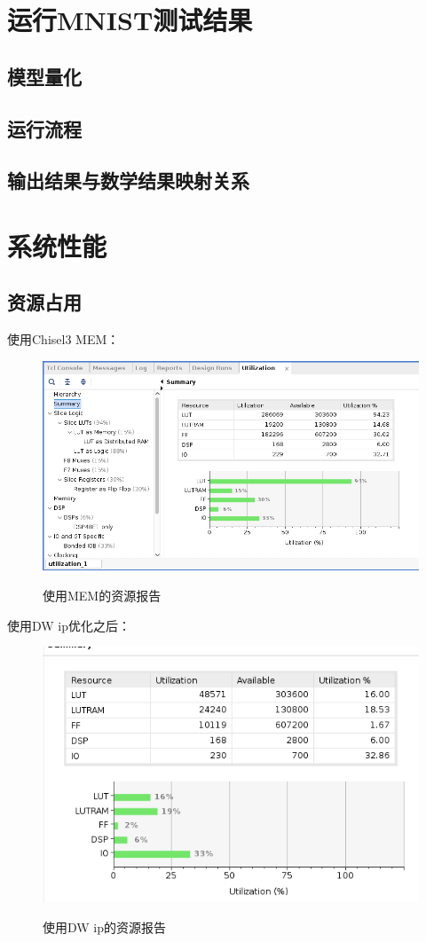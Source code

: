 \section{运行MNIST测试结果}
    \subsection{模型量化}
    \subsection{运行流程}
    \subsection{输出结果与数学结果映射关系}

\section{系统性能}
    \subsection{资源占用}
    使用Chisel3 MEM：
    \begin{figure}[h]
        \centering
        \includegraphics[scale=0.5]{../pdf/old_resource.png}\\
        \caption{使用MEM的资源报告}
    \end{figure}
    使用DW ip优化之后：
    \begin{figure}[h]
        \centering
        \includegraphics[scale=0.5]{../pdf/new_resource.png}\\
        \caption{使用DW ip的资源报告}
    \end{figure}

